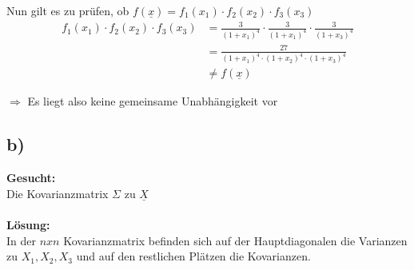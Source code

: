 \documentclass{article}
\begin{document}
Nun gilt es zu prüfen, ob $f(\underline{x}) = f_1(x_1) \cdot f_2(x_2) \cdot f_3(x_3)$ 
\begin{align*}
    f_1(x_1) \cdot f_2(x_2) \cdot f_3(x_3) &= \frac{3}{(1+x_1)^4} \cdot \frac{3}{(1+x_1)^4} \cdot \frac{3}{(1+ x_3)^4} \\
    &=\frac{27}{(1+x_1)^4\cdot(1+x_2)^4 \cdot(1+x_3)^4} \\
    &\neq f(\underline{x})
\end{align*}

$\Longrightarrow$  Es liegt also keine gemeinsame Unabhängigkeit vor
\subsection*{b)}
\textbf{Gesucht:} \\

Die Kovarianzmatrix $\Sigma$ zu $\underline{X}$ \\\\
\textbf{Lösung:} \\

In der $nxn$ Kovarianzmatrix befinden sich auf der Hauptdiagonalen die Varianzen zu $X_1, X_2, X_3$ und auf den restlichen Plätzen die Kovarianzen. \\
\end{document}
